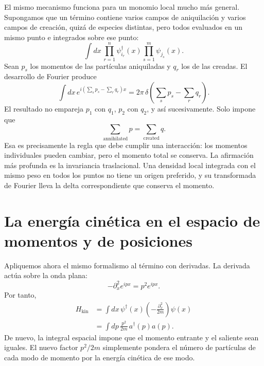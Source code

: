 El mismo mecanismo funciona para un monomio local mucho más general. Supongamos que un término contiene varios campos de aniquilación y varios campos de creación, quizá de especies distintas, pero todos evaluados en un mismo punto e integrados sobre ese punto:
\begin{equation}
\int dx\,
\prod_{r=1}^{n} \psi_{i_r}^\dagger(x)
\prod_{s=1}^{m} \psi_{j_s}(x).
\end{equation}
Sean \(p_s\) los momentos de las partículas aniquiladas y \(q_r\) los de las creadas. El desarrollo de Fourier produce
\begin{equation}
\int dx\,
e^{i(\sum_s p_s-\sum_r q_r)x}
=2\pi\,
\delta\!\left(\sum_s p_s-\sum_r q_r\right).
\label{eq:l9-total-momentum-delta}
\end{equation}
El resultado no empareja \(p_1\) con \(q_1\), \(p_2\) con \(q_2\), y así sucesivamente. Solo impone que
\begin{equation}
\sum_{\mathrm{annihilated}}p
=
\sum_{\mathrm{created}}q.
\end{equation}
Esa es precisamente la regla que debe cumplir una interacción: los momentos individuales pueden cambiar, pero el momento total se conserva. La afirmación más profunda es la invariancia traslacional. Una densidad local integrada con el mismo peso en todos los puntos no tiene un origen preferido, y su transformada de Fourier lleva la delta correspondiente que conserva el momento.

\begin{classroomqa}
\end{classroomqa}

\section{La energía cinética en el espacio de momentos y de posiciones}

Apliquemos ahora el mismo formalismo al término con derivadas. La derivada actúa sobre la onda plana:
\begin{equation}
-\partial_x^2 e^{ipx}=p^2e^{ipx}.
\end{equation}
Por tanto,
\begin{align}
H_{\mathrm{kin}}
&=\int dx\,\psi^\dagger(x)
\left(-\frac{\partial_x^2}{2m}\right)\psi(x)\\
&=\int dp\,\frac{p^2}{2m}\,a^\dagger(p)a(p).
\label{eq:l9-kinetic-momentum}
\end{align}
De nuevo, la integral espacial impone que el momento entrante y el saliente sean iguales. El nuevo factor \(p^2/2m\) simplemente pondera el número de partículas de cada modo de momento por la energía cinética de ese modo.

